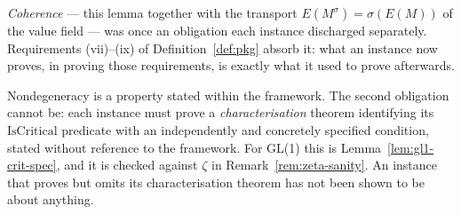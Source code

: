 \emph{Coherence} --- this lemma together with the transport $E(M^{\sigma}) = \sigma(E(M))$ of the
value field --- was once an obligation each instance discharged separately. Requirements
(vii)--(ix) of Definition~\ref{def:pkg} absorb it: what an instance now proves, in proving those
requirements, is exactly what it used to prove afterwards.

\begin{remark}
  \label{rem:crit-spec}
  Nondegeneracy is a property stated within the framework. The second obligation
  cannot be: each instance must prove a \emph{characterisation}
  theorem identifying its $\mathrm{IsCritical}$ predicate with an independently and
  concretely specified condition, stated without reference to the framework. For
  GL(1) this is Lemma~\ref{lem:gl1-crit-spec}, and it is checked against
  $\zeta$ in Remark~\ref{rem:zeta-sanity}. An instance that proves
   but omits its characterisation theorem has
  not been shown to be about anything.
\end{remark}

